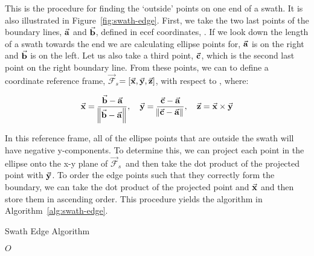 
\newcommand{\Fs}{$\vec{\mathcal{F}}_s$} 

This is the procedure for finding the `outside' points on one end of a swath.
It is also illustrated in Figure~\ref{fig:swath-edge}. First, we take the two
last points of the boundary lines, $\vec{\bm{\mathrm{a}}}$ and $\vec{\bm{\mathrm{b}}}$, defined in
\gls{ecef} coordinates, \Fe. If we look down the length of a swath towards the
end we are calculating ellipse points for, $\vec{\bm{\mathrm{a}}}$ is on the right and
$\vec{\bm{\mathrm{b}}}$ is on the left.  Let us also take a third point, $\vec{\bm{\mathrm{c}}}$, which is
the second last point on the right boundary line.  From these points, we can to
define a coordinate reference frame, \Fs $= [\vec{\bm{\mathrm{x}}}, \vec{\bm{\mathrm{y}}}, \vec{\bm{\mathrm{z}}}]$, with
respect to \Fe, where:

\begin{equation}
    \vec{\bm{\mathrm{x}}} = \frac{\vec{\bm{\mathrm{b}}}-\vec{\bm{\mathrm{a}}}}{\norm{\vec{\bm{\mathrm{b}}} - \vec{\bm{\mathrm{a}}}}}
    , \quad
    \vec{\bm{\mathrm{y}}} = \frac{\vec{\bm{\mathrm{c}}}-\vec{\bm{\mathrm{a}}}}{\norm{\vec{\bm{\mathrm{c}}} - \vec{\bm{\mathrm{a}}}}}
    , \quad
    \vec{\bm{\mathrm{z}}} = \vec{\bm{\mathrm{x}}} \times \vec{\bm{\mathrm{y}}}
\end{equation}

In this reference frame, all of the ellipse points that are outside the swath
will have negative y-components. To determine this, we can project each point
in the ellipse onto the x-y plane of \Fs~and then take the dot product of the
projected point with $\vec{\bm{\mathrm{y}}}$. To order the edge points such that they
correctly form the boundary, we can take the dot product of the projected point
and $\vec{\bm{\mathrm{x}}}$ and then store them in ascending order. This procedure yields
the algorithm in Algorithm~\ref{alg:swath-edge}.


\begin{algorithm}
    \caption{Swath Edge Algorithm} 
    \label{alg:swath-edge}
    \begin{algorithmic}[1] 
		
		
		


	    \EndIf
	\EndFor
	\State \Return $O$
	\EndFunction
    \end{algorithmic} 
\end{algorithm}

